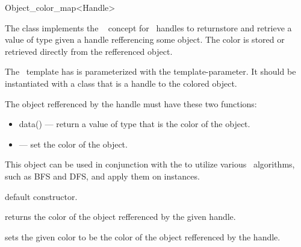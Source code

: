 
\ccRefPageBegin

\begin{ccRefClass}{Object_color_map<Handle>}
    
\ccDefinition

The class implements the \boost\  concept for 
\cgal\ handles to returnstore and retrieve a value of type 
 given a handle refferencing some object. The 
color is stored or retrieved directly from the refferenced object.

The \ccClassTemplateName\ template has is parameterized with
the  template-parameter. It should be instantiated with
a class that is a handle to the colored object.

The object refferenced by the handle must have these two functions:
\begin{itemize}
\item data() --- return a value of type  that 
is the color of the object.
\item {} --- set the color of the 
object.
\end{itemize}

This object can be used in conjunction with the 
to utilize various \boost\ algorithms, such as BFS and DFS, and
apply them on  instances.


\ccCreation
{}
    
    {default constructor.}
    
\ccAccessFunctions

    {returns the color of the object refferenced by the given handle.}
    
\ccModifiers

   {sets the given color to be the color of the object refferenced by the 
handle.}
    
\ccSeeAlso

\end{ccRefClass}

\ccRefPageEnd
